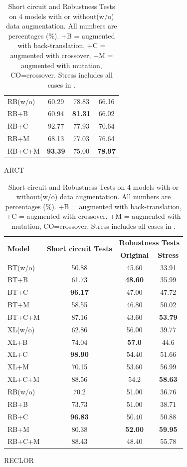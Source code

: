 \begin{table}[t!]
\begin{subtable}[t]{0.48\textwidth}
\begin{tabular}{l|c|cc}
			\rowcolor{Gray}
			RB(w/o)&60.29&78.83&66.16\\
			RB+B&60.94&\textbf{81.31}&66.02\\
			RB+C&92.77&77.93&70.64\\
			RB+M&68.13&77.03&76.64\\
			RB+C+M&\textbf{93.39}&75.00&\textbf{78.97}\\
			\bottomrule
		\end{tabular}
		\caption{ARCT}
	\end{subtable} 
	\hfill
	\begin{subtable}[t]{0.48\textwidth}
		\centering
		\begin{tabular}{l|c|cc}\toprule
			\multirow{2}{*}{\textbf{Model}}& \multirow{2}{*}{\bf Short circuit Tests} & \multicolumn{2}{c}{\bf Robustness Tests} \\ \cline{3-4}
			& & \textbf{Original} &\textbf{Stress}\\ \hline
			\rowcolor{Gray}
			BT(w/o)&50.88&45.60&33.91\\
			BT+B&61.73&\textbf{48.60}&35.99\\
			BT+C&\textbf{96.17}&47.00&47.72\\
			BT+M&58.55&46.80&50.02\\
			BT+C+M&87.16&43.60&\textbf{53.79}\\
			\midrule
			
			\rowcolor{Gray}
			XL(w/o)&62.86&56.00&39.77\\
			XL+B&74.04&\textbf{57.0}&44.6\\
			XL+C&\textbf{98.90}&54.40&51.66\\
			XL+M&70.15&53.60&56.99\\
			XL+C+M&88.56&54.2&\textbf{58.63}\\
			\midrule
			\rowcolor{Gray}
			RB(w/o)&70.2&51.00&36.76\\
			RB+B&73.73&51.00&38.71\\
			RB+C&\textbf{96.83}&50.40&50.88\\
			RB+M&80.38&\textbf{52.00}&\textbf{59.95}\\
			RB+C+M&88.43&48.40&55.78\\
			\bottomrule
		\end{tabular}
		\caption{RECLOR}
	\end{subtable}
	\caption{\label{tab:results} Short circuit and Robustness Tests
		on 4 models with or without(w/o) data augmentation.
		All numbers are percentages (\%). 
		+B = augmented with back-translation,
		+C = augmented with crossover, +M = augmented with mutation, 
		CO=crossover. 
		Stress includes all cases in .}
	
\end{table}
